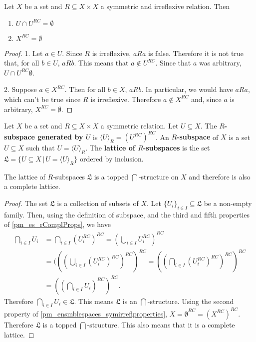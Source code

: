 \begin{prop}\label{pm_ensmblespaces_symirreflproperties}
	Let $X$ be a set and $R \subseteq X \times X$ a symmetric and irreflexive relation. Then
	\begin{enumerate}
		\item $U \cap U^{RC} = \emptyset$
		\item $X^{RC} = \emptyset$
	\end{enumerate}
\end{prop}

\begin{proof}
	1. Let $a \in U$. Since $R$ is irreflexive,  $aRa$ is false. Therefore it is not true that, for all $b \in U$, $aRb$. This means that $a \notin U^{RC}$. Since that $a$ was arbitrary, $U \cap U^{RC} \emptyset$.
	
	2. Suppose $a \in X^{RC}$. Then for all $b \in X$, $aRb$. In particular, we would have $aRa$, which can't be true since $R$ is irreflexive. Therefore $a \notin X^{RC}$ and, since $a$ is arbitrary, $X^{RC} = \emptyset$.
	
	
\end{proof}

\begin{defn}
	Let $X$ be a set and $R \subseteq X \times X$ a symmetric relation. Let $U \subseteq X$. The \textbf{$R$-subspace generated by $U$} is $\langle U \rangle_R = (U^{RC})^{RC}$. An \textbf{$R$-subspace} of $X$ is a set $U \subseteq X$ such that $U = \langle U \rangle_R$. The \textbf{lattice of $R$-subspaces} is the set $\mathfrak{L} = \{ U \subseteq X \, | \, U = \langle U \rangle_R \}$ ordered by inclusion.
\end{defn}

\begin{coro}
	The lattice of $R$-subspaces $\mathfrak{L}$ is a topped $\bigcap$-structure on $X$ and therefore is also a complete lattice.
\end{coro}
\begin{proof}
	The set $\mathfrak{L}$ is a collection of subsets of $X$. Let $\{U_i\}_{i \in I} \subseteq \mathfrak{L}$ be a non-empty family. Then, using the definition of subspace, and the third and fifth properties of \ref{pm_es_rComplProps}, we have
	\begin{align*}
		\bigcap_{i \in I} U_i &= \bigcap_{i \in I} (U_i^{RC})^{RC} = (\bigcup_{i \in I} U_i^{RC})^{RC} \\
		&= (((\bigcup_{i \in I} (U_i^{RC})^{RC})^{RC})^{RC} = ((\bigcap_{i \in I} (U_i^{RC})^{RC})^{RC})^{RC} \\
		&= ((\bigcap_{i \in I} U_i)^{RC})^{RC}.
	\end{align*}
	Therefore $\bigcap_{i \in I} U_i \in \mathfrak{L}$. This means $\mathfrak{L}$ is an $\bigcap$-structure. Using the second property of \ref{pm_ensmblespaces_symirreflproperties}, $X = \emptyset^{RC} = (X^{RC})^{RC}$. Therefore $\mathfrak{L}$ is a topped $\bigcap$-structure. This also means that it is a complete lattice.
\end{proof}

